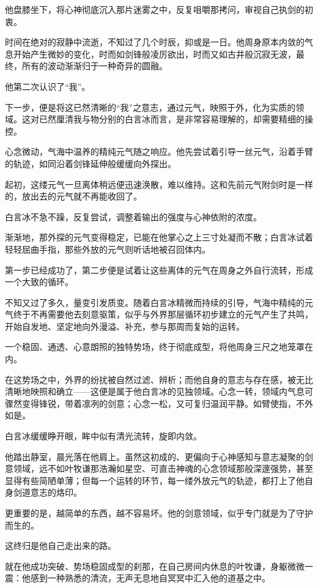 他盘膝坐下，将心神彻底沉入那片迷雾之中，反复咀嚼那拷问，审视自己执剑的初衷。

时间在绝对的寂静中流逝，不知过了几个时辰，抑或是一日。他周身原本内敛的气息开始产生微妙的变化，时而如剑锋般凌厉欲出，时而又如古井般沉寂无波，最终，所有的波动渐渐归于一种奇异的圆融。

他第二次认识了“我”。

下一步，便是将这已然清晰的“我”之意志，通过元气，映照于外，化为实质的领域。这对已然厘清我与物分别的白言冰而言，是非常容易理解的，却需要精细的操控。

心念微动，气海中温养的精纯元气随之响应。他先尝试着引导一丝元气，沿着手臂的轨迹，如同沿着剑锋延伸般缓缓向外探出。

起初，这缕元气一旦离体稍远便迅速涣散，难以维持。这和先前元气附剑时是一样的，放出去的元气就不再能收回了。

白言冰不急不躁，反复尝试，调整着输出的强度与心神依附的浓度。

渐渐地，那外探的元气变得稳定，已能在他掌心之上三寸处凝而不散；白言冰试着轻轻屈曲手指，那些外放的元气则听话地被召回体内。

第一步已经成功了，第二步便是试着让这些离体的元气在周身之外自行流转，形成一个大致的循环。

不知又过了多久，量变引发质变。随着白言冰精微而持续的引导，气海中精纯的元气终于不再需要他去刻意驱策，似乎与外界那层循环初步建立的元气产生了共鸣，开始自发地、坚定地向外漫溢、补充，参与那周而复始的运转。

一个稳固、通透、心意朗照的独特势场，终于彻底成型，将他周身三尺之地笼罩在内。

在这势场之中，外界的纷扰被自然过滤、辨析；而他自身的意志与存在感，被无比清晰地映照和确立——这便是属于他白言冰的见独领域。心念一转，领域内气息可骤然变得锋锐，带着凛冽的剑意；心念一松，又可复归温润平静。如臂使指，不外如是。

白言冰缓缓睁开眼，眸中似有清光流转，旋即内敛。

他踏出静室，晨光落在他肩上。虽然这初成的、更偏向于心神感知与意志凝聚的剑意领域，远不如叶牧谦那浩瀚如星空、可直击神魂的心念领域那般深邃强势，甚至显得有些简陋单薄；但每一个运转的环节，每一缕外放元气的轨迹，都打上了他自身剑道意志的烙印。

更重要的是，越简单的东西，越不容易坏。他的剑意领域，似乎专门就是为了守护而生的。

这终归是他自己走出来的路。

\vspace{2em}

就在他成功突破、势场稳固成型的刹那，在自己房间内休息的叶牧谦，身躯微微一震：他感到一种熟悉的清流，无声无息地自冥冥中汇入他的道基之中。

